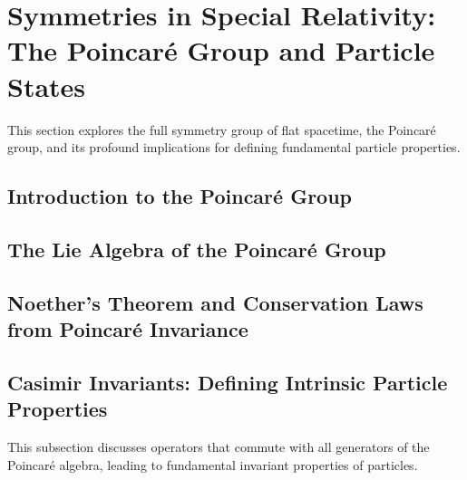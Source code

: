 \documentclass{amsart}
\theoremstyle{definition}
\theoremstyle{remark}
\begin{document}
\section{Symmetries in Special Relativity: The Poincaré Group and Particle States}
\label{sec:poincare_particle_states}

This section explores the full symmetry group of flat spacetime, the Poincaré group, and its profound implications for defining fundamental particle properties.

\subsection{Introduction to the Poincaré Group}
\label{subsec:intro_poincare}

\subsection{The Lie Algebra of the Poincaré Group}
\label{subsec:poincare_algebra}

\subsection{Noether's Theorem and Conservation Laws from Poincaré Invariance}
\label{subsec:noether_poincare}

\subsection{Casimir Invariants: Defining Intrinsic Particle Properties}
\label{subsec:casimir_invariants}
This subsection discusses operators that commute with all generators of the Poincaré algebra, leading to fundamental invariant properties of particles.
\end{document}
